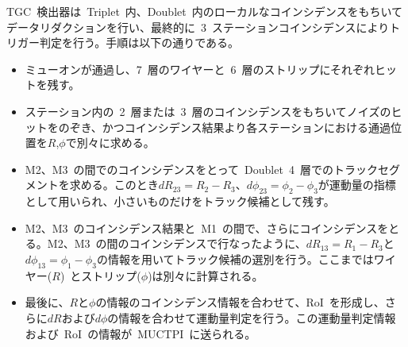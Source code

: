 TGC~検出器は~Triplet~内、Doublet~内のローカルなコインシデンスをもちいてデータリダクションを行い、最終的に~3~ステーションコインシデンスによりトリガー判定を行う。手順は以下の通りである。
\begin{itemize}
\item ミューオンが通過し、7~層のワイヤーと~6~層のストリップにそれぞれヒットを残す。
\item ステーション内の~2~層または~3~層のコインシデンスをもちいてノイズのヒットをのぞき、かつコインシデンス結果より各ステーションにおける通過位置を$R$,$\phi$で別々に求める。
\item M2、M3~の間でのコインシデンスをとって~Doublet~4~層でのトラックセグメントを求める。このとき$dR_{23}=R_2-R_3$、$d\phi_{23}=\phi_2-\phi_3$が運動量の指標として用いられ、小さいものだけをトラック候補として残す。
\item M2、M3~のコインシデンス結果と~M1~の間で、さらにコインシデンスをとる。M2、M3~の間のコインシデンスで行なったように、$dR_{13}=R_1-R_3$と$d\phi_{13}=\phi_1-\phi_3$の情報を用いてトラック候補の選別を行う。ここまではワイヤー($R$)~とストリップ($\phi$)は別々に計算される。
\item 最後に、$R$と$\phi$の情報のコインシデンス情報を合わせて、RoI~を形成し、さらに$dR$および$d\phi$の情報を合わせて運動量判定を行う。この運動量判定情報および~RoI~の情報が~MUCTPI~に送られる。
\end{itemize}


